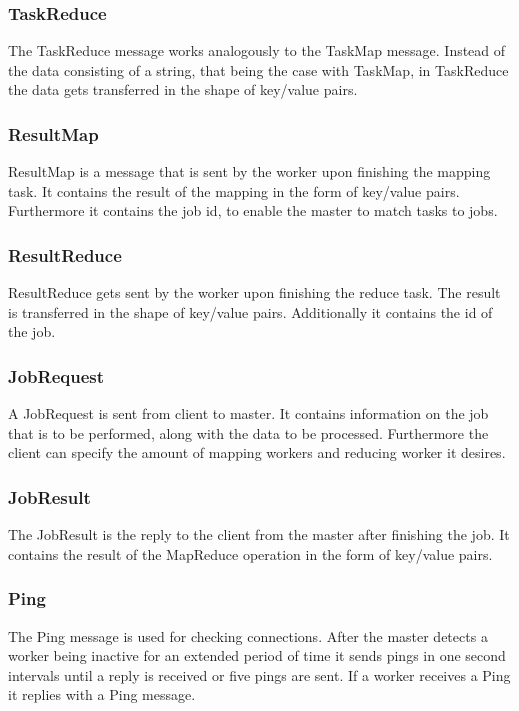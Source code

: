 \documentclass[12pt, letterpaper]{article}
\begin{document}
\subsubsection{TaskReduce}
The TaskReduce message works analogously to the TaskMap message. Instead of the data consisting of a string, that being the case with TaskMap, in TaskReduce the data gets transferred in the shape of key/value pairs. 

\subsubsection{ResultMap}
ResultMap is a message that is sent by the worker upon finishing the mapping task. It contains the result of the mapping in the form of key/value pairs. Furthermore it contains the job id, to enable the master to match tasks to jobs.

\subsubsection{ResultReduce}
ResultReduce gets sent by the worker upon finishing the reduce task. The result is transferred in the shape of key/value pairs. Additionally it contains the id of the job. 

\subsubsection{JobRequest}
A JobRequest is sent from client to master. It contains information on the job that is to be performed, along with the data to be processed. Furthermore the client can specify the amount of mapping workers and reducing worker it desires. 

\subsubsection{JobResult}
The JobResult is the reply to the client from the master after finishing the job. It contains the result of the MapReduce operation in the form of key/value pairs.  

\subsubsection{Ping}
The Ping message is used for checking connections. After the master detects a worker being inactive for an extended period of time it sends pings in one second intervals until a reply is received or five pings are sent. If a worker receives a Ping it replies with a Ping message.
\end{document}
